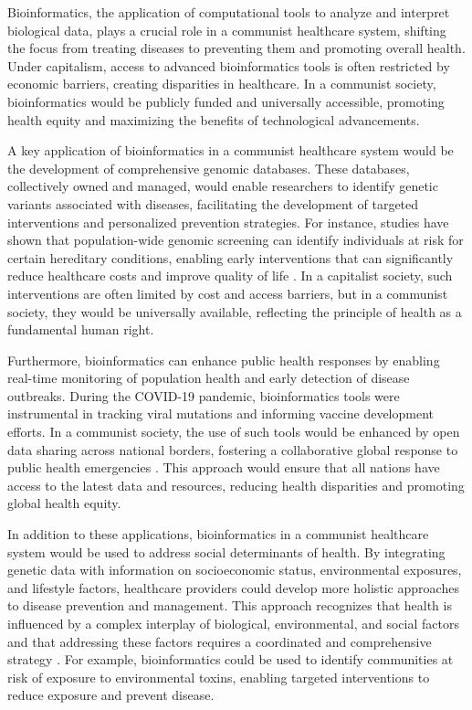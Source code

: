 Bioinformatics, the application of computational tools to analyze and interpret biological data, plays a crucial role in a communist healthcare system, shifting the focus from treating diseases to preventing them and promoting overall health. Under capitalism, access to advanced bioinformatics tools is often restricted by economic barriers, creating disparities in healthcare. In a communist society, bioinformatics would be publicly funded and universally accessible, promoting health equity and maximizing the benefits of technological advancements.

A key application of bioinformatics in a communist healthcare system would be the development of comprehensive genomic databases. These databases, collectively owned and managed, would enable researchers to identify genetic variants associated with diseases, facilitating the development of targeted interventions and personalized prevention strategies. For instance, studies have shown that population-wide genomic screening can identify individuals at risk for certain hereditary conditions, enabling early interventions that can significantly reduce healthcare costs and improve quality of life \cite[pp.~112-118]{johnson2019genomics}. In a capitalist society, such interventions are often limited by cost and access barriers, but in a communist society, they would be universally available, reflecting the principle of health as a fundamental human right.

Furthermore, bioinformatics can enhance public health responses by enabling real-time monitoring of population health and early detection of disease outbreaks. During the COVID-19 pandemic, bioinformatics tools were instrumental in tracking viral mutations and informing vaccine development efforts. In a communist society, the use of such tools would be enhanced by open data sharing across national borders, fostering a collaborative global response to public health emergencies \cite[pp.~35-40]{lee2020pandemics}. This approach would ensure that all nations have access to the latest data and resources, reducing health disparities and promoting global health equity.

In addition to these applications, bioinformatics in a communist healthcare system would be used to address social determinants of health. By integrating genetic data with information on socioeconomic status, environmental exposures, and lifestyle factors, healthcare providers could develop more holistic approaches to disease prevention and management. This approach recognizes that health is influenced by a complex interplay of biological, environmental, and social factors and that addressing these factors requires a coordinated and comprehensive strategy \cite[pp.~201-210]{smith2018inequalities}. For example, bioinformatics could be used to identify communities at risk of exposure to environmental toxins, enabling targeted interventions to reduce exposure and prevent disease.

